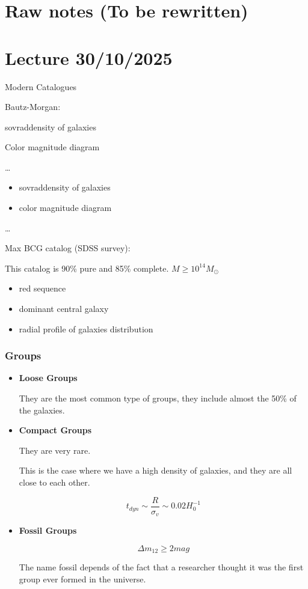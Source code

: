 \chapter{Raw notes (To be rewritten)}

\chapter{Lecture 30/10/2025}

Modern Catalogues

Bautz-Morgan: 

sovraddensity of galaxies

Color magnitude diagram

\dots

\begin{itemize}
    \item sovraddensity of galaxies
    \item color magnitude diagram
\end{itemize}

\dots

Max BCG catalog (SDSS survey):

This catalog is 90\% pure and 85\% complete. $M \ge 10^{14} M_{\odot}$

\begin{itemize}
    \item red sequence
    \item dominant central galaxy
    \item radial profile of galaxies distribution
\end{itemize}

\subsection{Groups}

\begin{itemize}
\item \textbf{Loose Groups}

They are the most common type of groups, they include almost the 50\% of the galaxies.

\item \textbf{Compact Groups}

They are very rare.

This is the case where we have a high density of galaxies, and they are all close to each other.

$$
t_{dyn} \sim \dfrac{R}{\sigma_v} \sim 0.02 H_0^{-1}
$$

\item \textbf{Fossil Groups}

$$
\Delta m_{12} \ge 2 mag
$$

\begin{tipsblock}
The name fossil depends of the fact that a researcher thought it was the first group ever formed in the universe.
\end{tipsblock}



\end{itemize}


